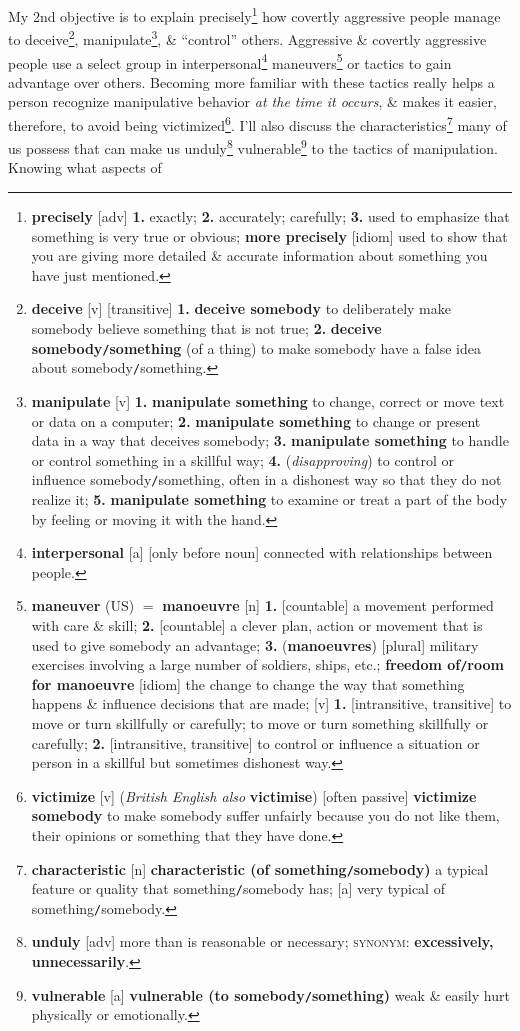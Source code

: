 \documentclass[oneside]{book}
\numberwithin{equation}{section}
\begin{document}
My 2nd objective is to explain precisely\footnote{\textbf{precisely} [adv] \textbf{1.} exactly; \textbf{2.} accurately; carefully; \textbf{3.} used to emphasize that something is very true or obvious; \textbf{more precisely} [idiom] used to show that you are giving more detailed \& accurate information about something you have just mentioned.} how covertly aggressive people manage to deceive\footnote{\textbf{deceive} [v] [transitive] \textbf{1.} \textbf{deceive somebody} to deliberately make somebody believe something that is not true; \textbf{2.} \textbf{deceive somebody\texttt{/}something} (of a thing) to make somebody have a false idea about somebody\texttt{/}something.}, manipulate\footnote{\textbf{manipulate} [v] \textbf{1.} \textbf{manipulate something} to change, correct or move text or data on a computer; \textbf{2.} \textbf{manipulate something} to change or present data in a way that deceives somebody; \textbf{3.} \textbf{manipulate something} to handle or control something in a skillful way; \textbf{4.} (\textit{disapproving}) to control or influence somebody\texttt{/}something, often in a dishonest way so that they do not realize it; \textbf{5.} \textbf{manipulate something} to examine or treat a part of the body by feeling or moving it with the hand.}, \& ``control'' others. Aggressive \& covertly aggressive people use a select group in interpersonal\footnote{\textbf{interpersonal} [a] [only before noun] connected with relationships between people.} maneuvers\footnote{\textbf{maneuver} (US) $=$ \textbf{manoeuvre} [n] \textbf{1.} [countable] a movement performed with care \& skill; \textbf{2.} [countable] a clever plan, action or movement that is used to give somebody an advantage; \textbf{3.} (\textbf{manoeuvres}) [plural] military exercises involving a large number of soldiers, ships, etc.; \textbf{freedom of\texttt{/}room for manoeuvre} [idiom] the change to change the way that something happens \& influence decisions that are made; [v] \textbf{1.} [intransitive, transitive] to move or turn skillfully or carefully; to move or turn something skillfully or carefully; \textbf{2.} [intransitive, transitive] to control or influence a situation or person in a skillful but sometimes dishonest way.}  or tactics to gain advantage over others. Becoming more familiar with these tactics really helps a person recognize manipulative behavior \textit{at the time it occurs}, \& makes it easier, therefore, to avoid being victimized\footnote{\textbf{victimize} [v] (\textit{British English also} \textbf{victimise}) [often passive] \textbf{victimize somebody} to make somebody suffer unfairly because you do not like them, their opinions or something that they have done.}. I'll also discuss the characteristics\footnote{\textbf{characteristic} [n] \textbf{characteristic (of something\texttt{/}somebody)} a typical feature or quality that something\texttt{/}somebody has; [a] very typical of something\texttt{/}somebody.} many of us possess that can make us unduly\footnote{\textbf{unduly} [adv] more than is reasonable or necessary; \textsc{synonym}: \textbf{excessively, unnecessarily}.} vulnerable\footnote{\textbf{vulnerable} [a] \textbf{vulnerable (to somebody\texttt{/}something)} weak \& easily hurt physically or emotionally.} to the tactics of manipulation. Knowing what aspects of 
\end{document}
